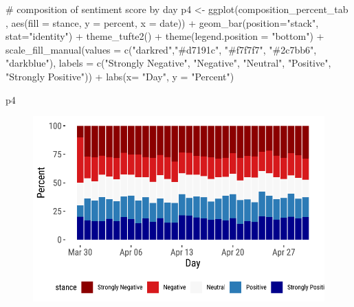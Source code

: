 \documentclass[
  letterpaper,
  DIV=11,
  numbers=noendperiod]{scrreprt}
\newenvironment{Shaded}{\begin{snugshade}}{\end{snugshade}}
\newcommand{\AttributeTok}[1]{\textcolor[rgb]{0.40,0.45,0.13}{#1}}
\newcommand{\CommentTok}[1]{\textcolor[rgb]{0.37,0.37,0.37}{#1}}
\newcommand{\FunctionTok}[1]{\textcolor[rgb]{0.28,0.35,0.67}{#1}}
\newcommand{\NormalTok}[1]{\textcolor[rgb]{0.00,0.23,0.31}{#1}}
\newcommand{\OtherTok}[1]{\textcolor[rgb]{0.00,0.23,0.31}{#1}}
\newcommand{\SpecialCharTok}[1]{\textcolor[rgb]{0.37,0.37,0.37}{#1}}
\newcommand{\StringTok}[1]{\textcolor[rgb]{0.13,0.47,0.30}{#1}}
\begin{document}
\begin{Shaded}
\begin{Highlighting}[]
\CommentTok{\# composition of sentiment score by day}
\NormalTok{p4 }\OtherTok{\textless{}{-}} \FunctionTok{ggplot}\NormalTok{(composition\_percent\_tab , }
             \FunctionTok{aes}\NormalTok{(}\AttributeTok{fill =}\NormalTok{ stance, }\AttributeTok{y =}\NormalTok{ percent, }\AttributeTok{x =}\NormalTok{ date)) }\SpecialCharTok{+} 
    \FunctionTok{geom\_bar}\NormalTok{(}\AttributeTok{position=}\StringTok{"stack"}\NormalTok{, }\AttributeTok{stat=}\StringTok{"identity"}\NormalTok{) }\SpecialCharTok{+} 
    \FunctionTok{theme\_tufte2}\NormalTok{() }\SpecialCharTok{+} 
    \FunctionTok{theme}\NormalTok{(}\AttributeTok{legend.position =} \StringTok{"bottom"}\NormalTok{) }\SpecialCharTok{+}
    \FunctionTok{scale\_fill\_manual}\NormalTok{(}\AttributeTok{values =} \FunctionTok{c}\NormalTok{(}\StringTok{"darkred"}\NormalTok{,}\StringTok{"\#d7191c"}\NormalTok{, }\StringTok{"\#f7f7f7"}\NormalTok{, }\StringTok{"\#2c7bb6"}\NormalTok{, }\StringTok{"darkblue"}\NormalTok{),}
                      \AttributeTok{labels =} \FunctionTok{c}\NormalTok{(}\StringTok{"Strongly Negative"}\NormalTok{, }\StringTok{"Negative"}\NormalTok{, }\StringTok{"Neutral"}\NormalTok{, }\StringTok{"Positive"}\NormalTok{, }\StringTok{"Strongly Positive"}\NormalTok{)) }\SpecialCharTok{+}
  \FunctionTok{labs}\NormalTok{(}\AttributeTok{x=} \StringTok{"Day"}\NormalTok{,}
       \AttributeTok{y =} \StringTok{"Percent"}\NormalTok{)}

\NormalTok{p4}
\end{Highlighting}
\end{Shaded}

\begin{figure}[H]

{\centering \includegraphics{sentiment-analysis_files/figure-pdf/unnamed-chunk-34-1.pdf}

}

\end{figure}
\end{document}
